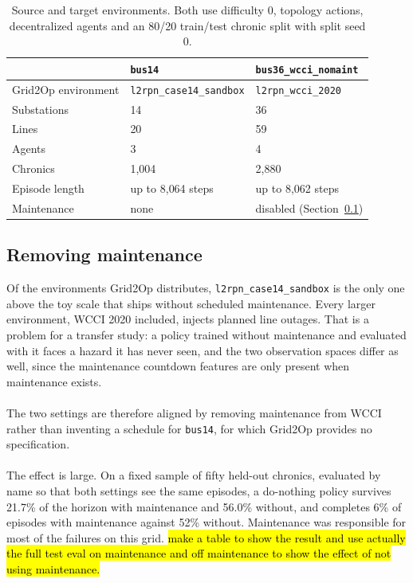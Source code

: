 \begin{table}[H]
  \centering
  \small
  \caption{Source and target environments. Both use difficulty 0, topology
  actions, decentralized agents and an 80/20 train/test chronic split with split
  seed 0.}
  \label{tab:wcci-env-comparison}
  \setlength{\tabcolsep}{6pt}
  \begin{tabular}{L{0.30\textwidth}L{0.28\textwidth}L{0.30\textwidth}}
    \toprule
    & \texttt{bus14} & \texttt{bus36\_wcci\_nomaint} \\
    \midrule
    Grid2Op environment & \texttt{l2rpn\_case14\_sandbox} & \texttt{l2rpn\_wcci\_2020} \\
    Substations & 14 & 36 \\
    Lines & 20 & 59 \\
    Agents & 3 & 4 \\
    Chronics & 1{,}004 & 2{,}880 \\
    Episode length & up to 8{,}064 steps & up to 8{,}062 steps \\
    Maintenance & none & disabled (Section~\ref{sec:wcci-nomaint}) \\
    \bottomrule
  \end{tabular}
\end{table}


\subsection{Removing maintenance}
\label{sec:wcci-nomaint}

Of the environments Grid2Op distributes, \texttt{l2rpn\_case14\_sandbox} is the
only one above the toy scale that ships without scheduled maintenance. Every
larger environment, WCCI 2020 included, injects planned line outages. That is a
problem for a transfer study: a policy trained without maintenance and evaluated
with it faces a hazard it has never seen, and the two observation spaces differ
as well, since the maintenance countdown features are only present when
maintenance exists.
\\
\\
The two settings are therefore aligned by removing maintenance from WCCI rather
than inventing a schedule for \texttt{bus14}, for which Grid2Op provides no
specification.
\\
\\
The effect is large. On a fixed sample of fifty held-out chronics, evaluated by
name so that both settings see the same episodes, a do-nothing policy survives
21.7\% of the horizon with maintenance and 56.0\% without, and completes 6\% of
episodes with maintenance against 52\% without. Maintenance was responsible for
most of the failures on this grid.
\hl{make a table to show the result and use actually the full test eval on maintenance and off maintenance to show the effect of not using maintenance.}


